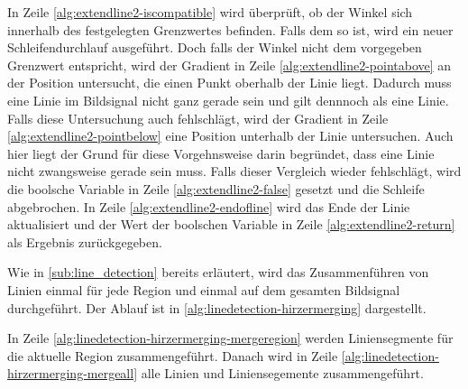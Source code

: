 

In Zeile \ref{alg:extendline2-iscompatible} wird überprüft, ob der Winkel sich innerhalb des festgelegten Grenzwertes
 befinden. Falls dem so ist, wird ein neuer Schleifendurchlauf ausgeführt. Doch falls der Winkel nicht dem vorgegeben
 Grenzwert entspricht, wird der Gradient in Zeile \ref{alg:extendline2-pointabove} an der Position untersucht, die
 einen Punkt oberhalb der Linie liegt. Dadurch muss eine Linie im Bildsignal nicht ganz gerade sein und gilt dennnoch
 als eine Linie. Falls diese Untersuchung auch fehlschlägt, wird der Gradient in Zeile \ref{alg:extendline2-pointbelow}
 eine Position unterhalb der Linie untersuchen. Auch hier liegt der Grund für diese Vorgehnsweise darin begründet, dass
 eine Linie nicht zwangsweise gerade sein muss. Falls dieser Vergleich wieder fehlschlägt, wird die boolsche Variable
 in Zeile \ref{alg:extendline2-false} gesetzt und die Schleife abgebrochen. In Zeile
 \ref{alg:extendline2-endofline} wird das Ende der Linie aktualisiert und der Wert der boolschen Variable in Zeile
 \ref{alg:extendline2-return} als Ergebnis zurückgegeben.

Wie in \autoref{sub:line_detection} bereits erläutert, wird das Zusammenführen von Linien einmal für jede Region und
 einmal auf dem gesamten Bildsignal durchgeführt. Der Ablauf ist in \autoref{alg:linedetection-hirzermerging}
 dargestellt.



In Zeile \ref{alg:linedetection-hirzermerging-mergeregion} werden Liniensegmente für die aktuelle Region
 zusammengeführt. Danach wird in Zeile \ref{alg:linedetection-hirzermerging-mergeall} alle Linien und Liniensegemente zusammengeführt.
